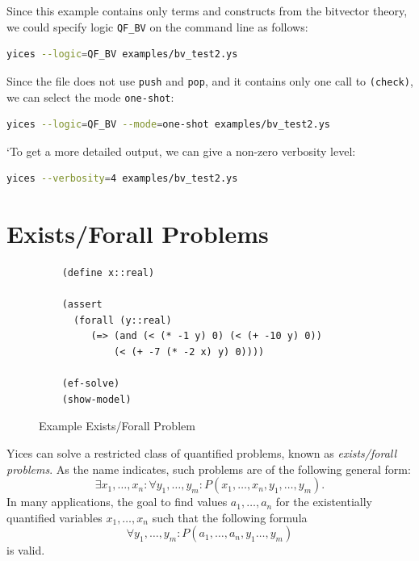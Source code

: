 \documentclass[11pt,twoside,fleqn,openright,titlepage]{cslreport}
\begin{document}
\medskip\noindent
Since  this  example  contains  only  terms and  constructs  from  the
bitvector  theory,  we  could  specify logic  \texttt{QF\_BV}  on  the
command line as follows:
\begin{small}
\begin{lstlisting}[language=sh]
   yices --logic=QF_BV examples/bv_test2.ys
\end{lstlisting}
\end{small}
Since the file does not use \texttt{push} and \texttt{pop}, and it
contains only one call to \texttt{(check)}, we can select the mode
\texttt{one-shot}:
\begin{small}
\begin{lstlisting}[language=sh]
   yices --logic=QF_BV --mode=one-shot examples/bv_test2.ys
\end{lstlisting}
\end{small}
`To get a more detailed output, we can give a non-zero verbosity level:
\begin{small}
\begin{lstlisting}[language=sh]
   yices --verbosity=4 examples/bv_test2.ys
\end{lstlisting}
\end{small}

\section{Exists/Forall Problems}

\begin{figure}
\begin{footnotesize}
\begin{verbatim}
    (define x::real)

    (assert
      (forall (y::real)
         (=> (and (< (* -1 y) 0) (< (+ -10 y) 0))
             (< (+ -7 (* -2 x) y) 0))))

    (ef-solve)
    (show-model)
\end{verbatim}
\end{footnotesize}
\caption{Example Exists/Forall Problem}
\label{example:ef}
\end{figure}

Yices can solve a restricted class of quantified problems, known as
\emph{exists/forall problems\/}. As the name indicates, such
problems are of the following general form:
$$\exists x_1,\ldots,x_n:\forall
y_1,\ldots,y_m: P(x_1,\ldots,x_n,y_1,\ldots,y_m).$$ In many
applications, the goal to find values $a_1,\ldots,a_n$ for the
existentially quantified variables $x_1,\ldots,x_n$ such that the
following formula $$\forall
y_1,\ldots,y_m: P(a_1,\ldots,a_n,y_1\ldots,y_m)$$ is valid.
\end{document}
